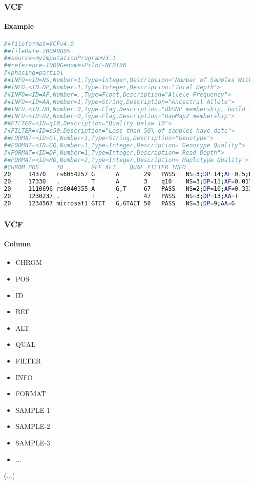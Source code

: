 \documentclass{beamer}
\begin{document}
\begin{frame}[fragile]
\frametitle{VCF}
\framesubtitle{Example}
\begin{lstlisting}[language=bash,basicstyle=\tiny,breaklines=false]
##fileformat=VCFv4.0
##fileDate=20090805
##source=myImputationProgramV3.1
##reference=1000GenomesPilot-NCBI36
##phasing=partial
##INFO=<ID=NS,Number=1,Type=Integer,Description="Number of Samples With Data">
##INFO=<ID=DP,Number=1,Type=Integer,Description="Total Depth">
##INFO=<ID=AF,Number=.,Type=Float,Description="Allele Frequency">
##INFO=<ID=AA,Number=1,Type=String,Description="Ancestral Allele">
##INFO=<ID=DB,Number=0,Type=Flag,Description="dbSNP membership, build 129">
##INFO=<ID=H2,Number=0,Type=Flag,Description="HapMap2 membership">
##FILTER=<ID=q10,Description="Quality below 10">
##FILTER=<ID=s50,Description="Less than 50% of samples have data">
##FORMAT=<ID=GT,Number=1,Type=String,Description="Genotype">
##FORMAT=<ID=GQ,Number=1,Type=Integer,Description="Genotype Quality">
##FORMAT=<ID=DP,Number=1,Type=Integer,Description="Read Depth">
##FORMAT=<ID=HQ,Number=2,Type=Integer,Description="Haplotype Quality">
#CHROM POS     ID        REF ALT    QUAL FILTER INFO                              FORMAT      NA00001        NA00002        NA00003
20     14370   rs6054257 G      A       29   PASS   NS=3;DP=14;AF=0.5;DB;H2           GT:GQ:DP:HQ 0|0:48:1:51,51 1|0:48:8:51,51 1/1:43:5:.,.
20     17330   .         T      A       3    q10    NS=3;DP=11;AF=0.017               GT:GQ:DP:HQ 0|0:49:3:58,50 0|1:3:5:65,3   0/0:41:3
20     1110696 rs6040355 A      G,T     67   PASS   NS=2;DP=10;AF=0.333,0.667;AA=T;DB GT:GQ:DP:HQ 1|2:21:6:23,27 2|1:2:0:18,2   2/2:35:4
20     1230237 .         T      .       47   PASS   NS=3;DP=13;AA=T                   GT:GQ:DP:HQ 0|0:54:7:56,60 0|0:48:4:51,51 0/0:61:2
20     1234567 microsat1 GTCT   G,GTACT 50   PASS   NS=3;DP=9;AA=G                    GT:GQ:DP    0/1:35:4       0/2:17:2       1/1:40:3
\end{lstlisting}
\end{frame}

\begin{frame}[fragile]
\frametitle{VCF}
\framesubtitle{Column}
\begin{itemize}
\item CHROM
\item POS
\item ID
\item REF
\item ALT
\item QUAL
\item FILTER
\item INFO
\item FORMAT
\item SAMPLE-1
\item SAMPLE-2
\item SAMPLE-3
\item ...
\end{itemize}
(...)
\end{frame}
\end{document}
